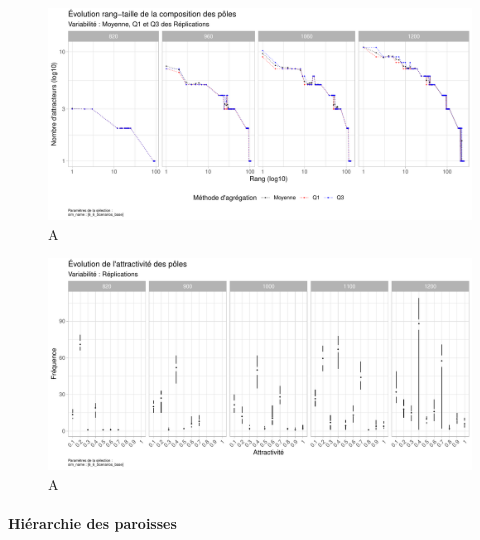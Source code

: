 \begin{figure}[H]
	\centering
	\includegraphics[width=\linewidth]{img/results_6_6/Poles_RT_Haut.pdf}
	\caption{A}
	\label{}
\end{figure}
\begin{figure}[H]
	\centering
	\includegraphics[width=\linewidth]{img/results_6_6/Poles_Attrac_Haut.pdf}
	\caption{A}
	\label{}
\end{figure}

\paragraph{Hiérarchie des paroisses}~\\

